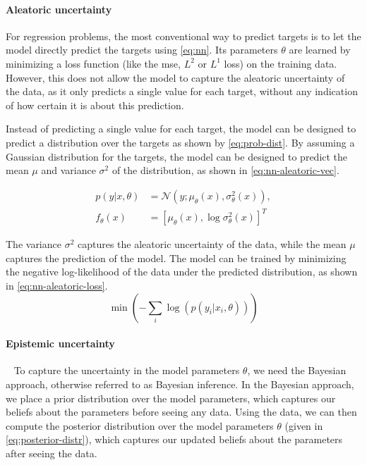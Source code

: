 \paragraph{Aleatoric uncertainty}
For regression problems, the most conventional way to predict targets is to let the model directly predict the targets using \cref{eq:nn}.
Its parameters $\theta$ are learned by minimizing a loss function (like the \gls{mse}, $L^2$ or $L^1$ loss) on the training data.
However, this does not allow the model to capture the aleatoric uncertainty of the data, as it only predicts a single value for each target, without any indication of how certain it is about this prediction.

Instead of predicting a single value for each target, the model can be designed to predict a distribution over the targets as shown by \cref{eq:prob-dist}.
By assuming a Gaussian distribution for the targets, the model can be designed to predict the mean $\mu$ and variance $\sigma^2$ of the distribution, as shown in \cref{eq:nn-aleatoric-vec}.

\begin{subequations}
\label{eq:nn-aleatoric}
    \begin{align}
        p(y|x, \theta) &= \mathcal{N}(y; \mu_{\theta}(x), \sigma^2_{\theta}(x)), \label{eq:prob-dist} \\
        f_\theta(x) &= [\mu_{\theta}(x), \log\sigma^2_{\theta}(x)]^T \label{eq:nn-aleatoric-vec}
    \end{align}
\end{subequations}

The variance $\sigma^2$ captures the aleatoric uncertainty of the data, while the mean $\mu$ captures the prediction of the model.
The model can be trained by minimizing the negative log-likelihood of the data under the predicted distribution, as shown in \cref{eq:nn-aleatoric-loss}.
\begin{equation}
    \min(-\sum_{i} \log(p(y_i|x_i, \theta)))
    \label{eq:nn-aleatoric-loss}
\end{equation}

\paragraph{Epistemic uncertainty}~\cite{src:scalable-bayesian-deep-learning, src:bayesian-deep-learning-epistemic}
To capture the uncertainty in the model parameters $\theta$, we need the Bayesian approach, otherwise referred to as Bayesian inference.
In the Bayesian approach, we place a prior distribution over the model parameters, which captures our beliefs about the parameters before seeing any data.
Using the data, we can then compute the posterior distribution over the model parameters $\theta$ (given in \cref{eq:posterior-distr}), which captures our updated beliefs about the parameters after seeing the data.


